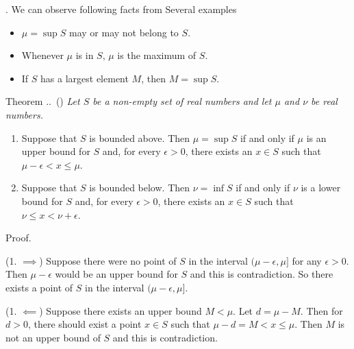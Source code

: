 \documentclass[8pt]{beamer}
\newcounter{thm}
\newcounter{ex}
\renewcommand{\thethm}{\thesection.\thesubsection.\arabic{thm}}
\renewenvironment{theorem}[1][]{%
    \refstepcounter{thm}%
    \begin{block}{Theorem \thethm\if\relax\detokenize{#1}\relax\else\ (#1)\fi}%
    \itshape
}{%
    \end{block}%
}
\begin{document}
\begin{frame}{.}
    We can observe following facts from Several examples
    \begin{itemize}
        \item $\mu = \sup S$ may or may not belong to $S$.
        \item Whenever $\mu$ is in $S$, $\mu$ is the maximum of $S$.
        \item If $S$ has a largest element $M$, then $M = \sup S$.
    \end{itemize}

    \begin{theorem} \label{th:1.1.1}
        Let $S$ be a non-empty set  of real numbers and let $\mu$ and $\nu$ be real numbers.
        \begin{enumerate}
            \item Suppose that $S$ is bounded above. Then $\mu = \sup S$ if and only if $\mu$ is an upper bound for $S$ and, for every $\epsilon >0$, there exists an $x \in S$ such that $\mu - \epsilon < x \leq \mu$.
            \item Suppose that $S$ is bounded below. Then $\nu = \inf S$ if and only if $\nu$ is a lower bound for $S$ and, for every $\epsilon > 0$, there exists an $x \in S$ such that $\nu \leq x < \nu + \epsilon$.
        \end{enumerate}

        Proof.

        (1. $\implies$) Suppose there were no point of $S$ in the interval $(\mu - \epsilon,\mu]$ for any $\epsilon >0$.
        Then $\mu-\epsilon$ would be an upper bound for $S$ and this is contradiction.
        So there exists a point of $S$ in the interval $(\mu - \epsilon, \mu]$.

        (1. $\impliedby$) Suppose there exists an upper bound $M < \mu$.
        Let $d = \mu - M$.
        Then for $d >0$, there should exist a point $x \in S$ such that $\mu - d = M < x \leq \mu$.
        Then $M$ is not an upper bound of $S$ and this is contradiction.
    \end{theorem}
\end{frame}
\end{document}
